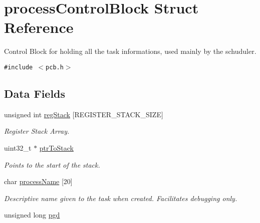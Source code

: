 \hypertarget{structprocess_control_block}{
\section{processControlBlock Struct Reference}
\label{structprocess_control_block}
}
Control Block for holding all the task informations, used mainly by the schuduler.  


{\tt \#include $<$pcb.h$>$}

\subsection*{Data Fields}
\begin{CompactItemize}
\item 
\hypertarget{structprocess_control_block_8ecf4f4cf7cf110755d39adcbdcf6dc4}{
unsigned int \hyperlink{structprocess_control_block_8ecf4f4cf7cf110755d39adcbdcf6dc4}{regStack} \mbox{[}REGISTER\_\-STACK\_\-SIZE\mbox{]}}
\label{structprocess_control_block_8ecf4f4cf7cf110755d39adcbdcf6dc4}

\begin{CompactList}\small\item\em Register Stack Array. \item\end{CompactList}\item 
\hypertarget{structprocess_control_block_b2af277c72882910be2b136976551d54}{
uint32\_\-t $\ast$ \hyperlink{structprocess_control_block_b2af277c72882910be2b136976551d54}{ptrToStack}}
\label{structprocess_control_block_b2af277c72882910be2b136976551d54}

\begin{CompactList}\small\item\em Points to the start of the stack. \item\end{CompactList}\item 
\hypertarget{structprocess_control_block_f7f2be4cd50729f89344d33f9bfb74cd}{
char \hyperlink{structprocess_control_block_f7f2be4cd50729f89344d33f9bfb74cd}{processName} \mbox{[}20\mbox{]}}
\label{structprocess_control_block_f7f2be4cd50729f89344d33f9bfb74cd}

\begin{CompactList}\small\item\em Descriptive name given to the task when created. Facilitates debugging only. \item\end{CompactList}\item 
\hypertarget{structprocess_control_block_cafa2bbce99614e6736f2590b765943a}{
unsigned long \hyperlink{structprocess_control_block_cafa2bbce99614e6736f2590b765943a}{pgd}}
\label{structprocess_control_block_cafa2bbce99614e6736f2590b765943a}


\end{CompactItemize}
